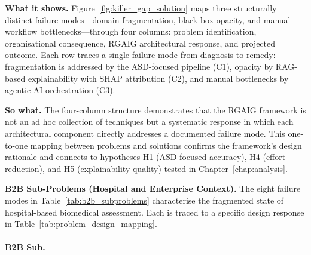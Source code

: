 \noindent\textbf{What it shows.} Figure~\ref{fig:killer_gap_solution} maps three structurally distinct failure modes---domain fragmentation, black-box opacity, and manual workflow bottlenecks---through four columns: problem identification, organisational consequence, RGAIG architectural response, and projected outcome. Each row traces a single failure mode from diagnosis to remedy: fragmentation is addressed by the ASD-focused pipeline (C1), opacity by RAG-based explainability with SHAP attribution (C2), and manual bottlenecks by agentic AI orchestration (C3).


\noindent\textbf{So what.} The four-column structure demonstrates that the RGAIG framework is not an ad hoc collection of techniques but a systematic response in which each architectural component directly addresses a documented failure mode. This one-to-one mapping between problems and solutions confirms the framework's design rationale and connects to hypotheses H1 (ASD-focused accuracy), H4 (effort reduction), and H5 (explainability quality) tested in Chapter~\ref{chap:analysis}.
\fi

\noindent\textbf{B2B Sub-Problems (Hospital and Enterprise Context).} The eight failure modes in Table~\ref{tab:b2b_subproblems} characterise the fragmented state of hospital-based biomedical assessment. Each is traced to a specific design response in Table~\ref{tab:problem_design_mapping}.

\paragraph{B2B Sub.}



